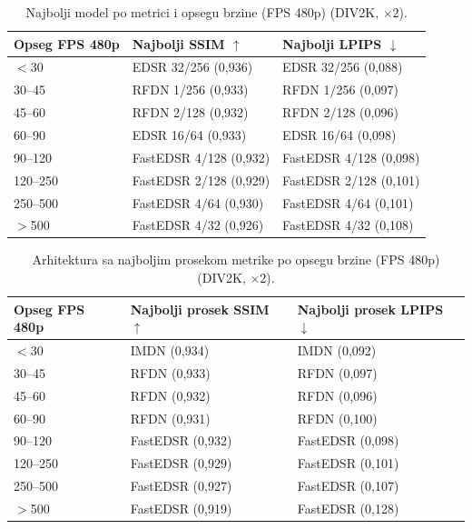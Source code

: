 
\begin{table}[H]
    \centering
    \caption{Najbolji model po metrici i opsegu brzine (FPS 480p) (DIV2K, $\times2$).}
    \label{tab:fps_bins_best_model_2x_DIV2K}
    \small
    \setlength{\tabcolsep}{4pt}
    \begin{tabular}{@{}lll@{}}
        \toprule
        Opseg FPS 480p & Najbolji SSIM $\uparrow$ & Najbolji LPIPS $\downarrow$ \\
        \midrule
        $<$30 & EDSR 32/256 (0,936) & EDSR 32/256 (0,088) \\
        30--45 & RFDN 1/256 (0,933) & RFDN 1/256 (0,097) \\
        45--60 & RFDN 2/128 (0,932) & RFDN 2/128 (0,096) \\
        60--90 & EDSR 16/64 (0,933) & EDSR 16/64 (0,098) \\
        90--120 & FastEDSR 4/128 (0,932) & FastEDSR 4/128 (0,098) \\
        120--250 & FastEDSR 2/128 (0,929) & FastEDSR 2/128 (0,101) \\
        250--500 & FastEDSR 4/64 (0,930) & FastEDSR 4/64 (0,101) \\
        $>$500 & FastEDSR 4/32 (0,926) & FastEDSR 4/32 (0,108) \\
        \bottomrule
    \end{tabular}
\end{table}

\begin{table}[H]
    \centering
    \caption{Arhitektura sa najboljim prosekom metrike po opsegu brzine (FPS 480p) (DIV2K, $\times2$).}
    \label{tab:fps_bins_best_arch_2x_DIV2K}
    \small
    \setlength{\tabcolsep}{4pt}
    \begin{tabular}{@{}lll@{}}
        \toprule
        Opseg FPS 480p & Najbolji prosek SSIM $\uparrow$ & Najbolji prosek LPIPS $\downarrow$ \\
        \midrule
        $<$30 & IMDN (0,934) & IMDN (0,092) \\
        30--45 & RFDN (0,933) & RFDN (0,097) \\
        45--60 & RFDN (0,932) & RFDN (0,096) \\
        60--90 & RFDN (0,931) & RFDN (0,100) \\
        90--120 & FastEDSR (0,932) & FastEDSR (0,098) \\
        120--250 & FastEDSR (0,929) & FastEDSR (0,101) \\
        250--500 & FastEDSR (0,927) & FastEDSR (0,107) \\
        $>$500 & FastEDSR (0,919) & FastEDSR (0,128) \\
        \bottomrule
    \end{tabular}
\end{table}

